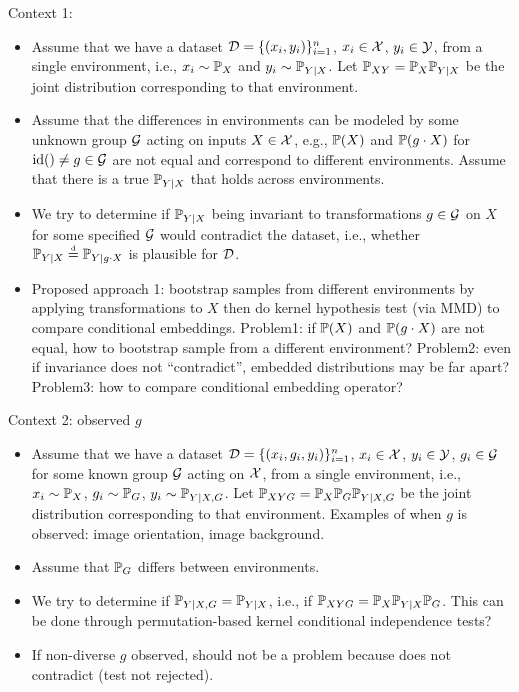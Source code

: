 \documentclass[10pt]{article}
\begin{document}
\todo

Context 1:

\begin{itemize}

\item
Assume that we have a dataset $\mathcal{D}=\{(x_i,y_i)\}_{i=1}^n$, $x_i\in\mathcal{X}$, $y_i\in\mathcal{Y}$, from a single environment, i.e., $x_i\sim\mathbb{P}_X$ and $y_i\sim\mathbb{P}_{Y|X}$. Let $\mathbb{P}_{XY}=\mathbb{P}_X\mathbb{P}_{Y|X}$ be the joint distribution corresponding to that environment.

\item
Assume that the differences in environments can be modeled by some unknown group $\mathcal{G}$ acting on inputs $X\in\mathcal{X}$, e.g., $\mathbb{P}(X)$ and $\mathbb{P}(g\cdot X)$ for $\mathrm{id}()\neq g\in\mathcal{G}$ are not equal and correspond to different environments. Assume that there is a true $\mathbb{P}_{Y|X}$ that holds across environments.

\item
We try to determine if $\mathbb{P}_{Y|X}$ being invariant to transformations $g\in\mathcal{G}$ on $X$ for some specified $\mathcal{G}$ would contradict the dataset, i.e., whether $\mathbb{P}_{Y|X}\stackrel{\text{\rm\tiny d}}{=}\mathbb{P}_{Y|g\cdot X}$ is plausible for $\mathcal{D}$.

\item
Proposed approach 1: bootstrap samples from different environments by applying transformations to $X$ then do kernel hypothesis test (via MMD) to compare conditional embeddings. \todo Problem1: if  $\mathbb{P}(X)$ and $\mathbb{P}(g\cdot X)$ are not equal, how to bootstrap sample from a different environment? \todo Problem2: even if invariance does not ``contradict'', embedded distributions may be far apart? \todo Problem3: how to compare conditional embedding operator?

\end{itemize}

Context 2: observed $g$

\begin{itemize}

\item
Assume that we have a dataset $\mathcal{D}=\{(x_i,g_i,y_i)\}_{i=1}^n$, $x_i\in\mathcal{X}$, $y_i\in\mathcal{Y}$, $g_i\in\mathcal{G}$ for some known group $\mathcal{G}$ acting on $\mathcal{X}$, from a single environment, i.e., $x_i\sim\mathbb{P}_X$, $g_i\sim\mathbb{P}_G$, $y_i\sim\mathbb{P}_{Y|X,G}$. Let $\mathbb{P}_{XYG}=\mathbb{P}_X\mathbb{P}_G\mathbb{P}_{Y|X,G}$ be the joint distribution corresponding to that environment. Examples of when $g$ is observed: image orientation, image background.

\item
Assume that $\mathbb{P}_G$ differs between environments.

\item
We try to determine if $\mathbb{P}_{Y|X,G}=\mathbb{P}_{Y|X}$, i.e., if $\mathbb{P}_{XYG}=\mathbb{P}_X\mathbb{P}_{Y|X}\mathbb{P}_G$. \todo This can be done through permutation-based kernel conditional independence tests?

\item
\todo If non-diverse $g$ observed, should not be a problem because does not contradict (test not rejected).

\end{itemize}
\end{document}
